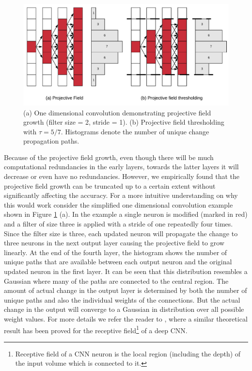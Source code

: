 \begin{figure}[t]
\includegraphics[width=\columnwidth]{images/pf_truncate}
\caption{(a) One dimensional convolution demonstrating projective field growth (filter size = 2, stride = 1). (b) Projective field thresholding with $\tau = 5/7$. Histograms denote the number of unique change propagation paths.}
\label{fig:pf_truncate}
\end{figure}

Because of the projective field growth, even though there will be much computational redundancies in the early layers, towards the latter layers it will decrease or even have no redundancies.
However, we empirically found that the projective field growth can be truncated up to a certain extent without significantly affecting the accuracy.
For a more intuitive understanding on why this would work consider the simplified one dimensional convolution example shown in Figure \ref{fig:pf_truncate} (a). In the example a single neuron is modified (marked in red) and a filter of size three is applied with a stride of one repeatedly four times.
Since the filter size is three, each updated neuron will propagate the change to three neurons in the next output layer causing the projective field to grow linearly.
At the end of the fourth layer, the histogram shows the number of unique paths that are available between each output neuron and the original updated neuron in the first layer.
It can be seen that this distribution resembles a Gaussian where many of the paths are connected to the central region.
The amount of actual change in the output layer is determined by both the number of unique paths and also the individual weights of the connections.
But the actual change in the output will converge to a Gaussian in distribution over all possible weight values.
For more details we refer the reader to \cite{luo2016understanding}, where a similar theoretical result has been proved for the receptive field\footnote{Receptive field of a CNN neuron is the local region (including the depth) of the input volume which is connected to it.} of a deep CNN.

